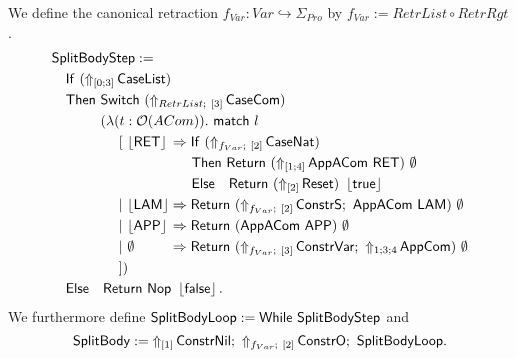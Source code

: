 \begin{definition}
  \label{def:JumpTarget}
  We define the canonical retraction $f_{Var} : Var \hookrightarrow \Sigma_{Pro}$ by $f_{Var} := RetrList \circ RetrRgt$.
  \begin{alignat*}{1}
    & \MS{SplitBodyStep} := \\
    & \quad \MS{If}~(\LiftTapes{\MS{CaseList}}{\Vector{0;3}}) \\
    & \quad \MS{Then}~\Switch~(\LiftBoth{\MS{CaseCom}}{RetrList}{\Vector{3}}) \\
    & \quad \phantom{\MS{Then}}~(\lambda (t : \Option(ACom)).~\MS{match}~l\\
    & \quad \phantom{\MS{Then}~(\lambda}~[~ \phalign{\Some{\MS{LAM}}}{\Some{\MS{RET}}} \Rightarrow \MS{If}~(\LiftBoth{\MS{CaseNat}}{f_{Var}}{\Vector{2}}) \\
    & \quad \phantom{\MS{Then}~(\lambda~[~ \Some{\MS{LAM} \Rightarrow}}~\MS{Then}~ \Return{(\LiftTapes{\MS{AppACom~\MS{RET}}}{\Vector{1;4}})}{\None} \\
    & \quad \phantom{\MS{Then}~(\lambda~[~ \Some{\MS{LAM} \Rightarrow}}~\MS{Else}~~~ \Return{(\LiftTapes{\MS{Reset}}{\Vector{2}})}{\Some\true} \\
    & \quad \phantom{\MS{Then}~(\lambda}~|~ \phalign{\Some{\MS{LAM}}}{\Some{\MS{LAM}}} \Rightarrow \Return{(\LiftBoth{\MS{ConstrS}}{f_{Var}}{\Vector{2}} \Seq \MS{AppACom}~\MS{LAM})}{\None} \\
    & \quad \phantom{\MS{Then}~(\lambda}~|~ \phalign{\Some{\MS{LAM}}}{\Some{\MS{APP}}} \Rightarrow \Return{(\MS{AppACom}~\MS{APP})}{\None} \\
    & \quad \phantom{\MS{Then}~(\lambda}~|~ \phalign{\Some{\MS{LAM}}}{\None} \Rightarrow \Return{(\LiftBoth{\MS{ConstrVar}}{f_{Var}}{\Vector{3}} \Seq \LiftTapes{\MS{AppCom}}{1;3;4})}{\None} \\
    & \quad \phantom{\MS{Then}~(\lambda}~]) \\
    & \quad \MS{Else}~~~ \Return{\Nop}{\Some\false}.
  \end{alignat*}
  We furthermore define $\MS{SplitBodyLoop} := \While~\MS{SplitBodyStep}$ and
  \[
    \MS{SplitBody} := \LiftTapes{\MS{ConstrNil}}{\Vector{1}} \Seq \LiftBoth{\MS{ConstrO}}{f_{Var}}{\Vector{2}} \Seq \MS{SplitBodyLoop}.
  \]
\end{definition}


